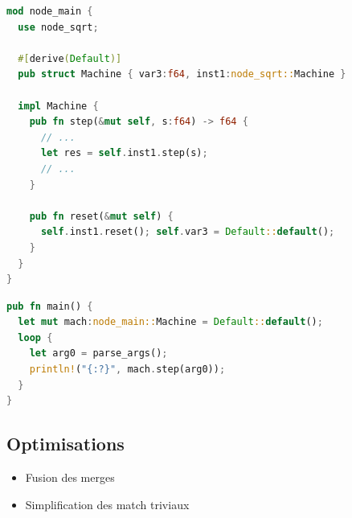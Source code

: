 \documentclass[11pt,usenames,dvipsnames]{beamer}
\begin{document}
\begin{frame}[fragile]{\null}
  \begin{lstlisting}[language=Rust]
mod node_main {
  use node_sqrt;

  #[derive(Default)]
  pub struct Machine { var3:f64, inst1:node_sqrt::Machine }

  impl Machine {
    pub fn step(&mut self, s:f64) -> f64 {
      // ...
      let res = self.inst1.step(s);
      // ...
    }

    pub fn reset(&mut self) {
      self.inst1.reset(); self.var3 = Default::default();
    }
  }
}
\end{lstlisting}
\end{frame}

\begin{frame}[fragile]{\null}
  \begin{lstlisting}[language=Rust]
pub fn main() {
  let mut mach:node_main::Machine = Default::default();
  loop {
    let arg0 = parse_args();
    println!("{:?}", mach.step(arg0));
  }
}
  \end{lstlisting}
\end{frame}



\subsection{Optimisations}
\begin{frame}{\null}
  \begin{itemize}
  \item Fusion des merges
  \item Simplification des match triviaux
  \end{itemize}
\end{frame}
\end{document}
